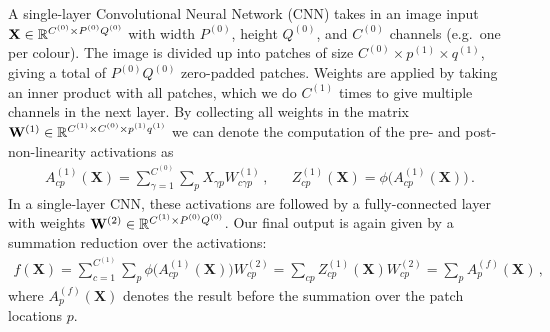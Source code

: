 \documentclass{article}
\theoremstyle{definition}
\newcommand{\vX}{\mathbf{X}}
\newcommand{\vW}{\mathbf{W}}
\newcommand{\vA}{\mathbf{A}}
\begin{document}
\newcommand{\layerC}[1]{C^{(#1)}}
\newcommand{\layerw}[1]{P^{(#1)}}
\newcommand{\layerh}[1]{Q^{(#1)}}
\newcommand{\layersize}[1]{\layerw{#1}\layerh{#1}}
\newcommand{\patchw}[1]{p^{(#1)}}
\newcommand{\patchh}[1]{q^{(#1)}}
\newcommand{\patchsize}[1]{\patchw{#1}\patchh{#1}}
\newcommand{\patchidx}{\nu}
\newcommand{\W}[1]{\vW}
\newcommand{\layerWs}[1]{W^{(#1)}}
\newcommand{\layerW}[1]{\vW^{(#1)}}
\newcommand{\priorWcov}[1]{\boldsymbol{\Sigma}^{(#1)}}
\newcommand{\priorWcovs}[1]{\Sigma^{(#1)}}
\newcommand{\layerAs}[2]{A^{\!(#1)}_{#2}\!(\vX)}
\newcommand{\layerAsd}[2]{A^{\!(#1)}_{#2}\!(\vX')}
\newcommand{\layerNLAs}[2]{Z^{(#1)}_{#2}\!(\vX)}
\newcommand{\layerNLAsd}[2]{Z^{(#1)}_{#2}\!(\vX')}
\newcommand{\layerA}[1]{\vA^{\!(#1)}\!(\vX)}
\newcommand{\layerAd}[1]{\vA^{\!(#1)}\!(\vX')}
\newcommand{\chan}{c}
\newcommand{\prevchan}{\gamma}   %
\newcommand{\patch}{p}               %
\newcommand{\nextpatch}{\mu} 
A single-layer Convolutional Neural Network (CNN) takes in an image input $\vX \in \Reals^{\layerC{0}\times \layersize{0}}$ with width $\layerw{0}$, height $\layerh{0}$, and $\layerC{0}$ channels (e.g.~one per colour). The image is divided up into patches of size $\layerC{0}\times\!\patchw{1}\times\!\patchh{1}$, giving a total of $\layersize{0}$ zero-padded patches. Weights are applied by taking an inner product with all patches, which we do $\layerC{1}$ times to give multiple channels in the next layer. By collecting all weights in the matrix $\layerW{1}\in\Reals^{\layerC1\times \layerC0\times \patchw1\patchh1}$ we can denote the computation of the pre- and post-non-linearity activations as
\begin{align}
    \layerAs{1}{cp} = \sum_{\gamma=1}^{\layerC0}\sum_{p} X_{\gamma p} \layerWs1_{c\gamma p} \,, && \layerNLAs{1}{cp} = \phi\big(\layerAs{1}{cp}\big)\,.
\end{align}
In a single-layer CNN, these activations are followed by a fully-connected layer with weights $\layerW{2} \in \Reals^{\layerC 1\times \layerw0\layerh0}$. Our final output is again given by a summation reduction over the activations:
\begin{align}
    f(\vX) = \sum_{c=1}^{\layerC1}\sum_{p} \phi\big(\layerAs{1}{cp}\big) W^{(2)}_{cp} = \sum_{cp} \layerNLAs{1}{cp}\layerWs{2}_{cp} = \sum_p \layerAs{f}{p} \label{eq:single-layer-f} \,,
\end{align}
where $\layerAs{f}{p}$ denotes the result before the summation over the patch locations $p$. 
\end{document}

